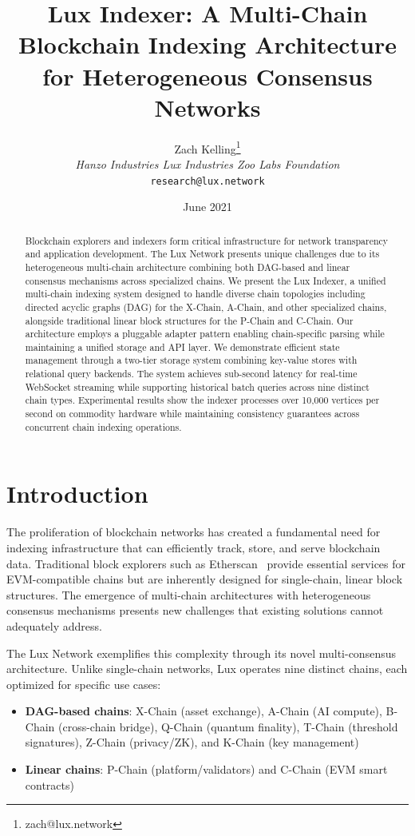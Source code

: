 \documentclass[11pt,twocolumn]{article}
\title{Lux Indexer: A Multi-Chain Blockchain Indexing Architecture for Heterogeneous Consensus Networks}
\author{Zach Kelling\thanks{zach@lux.network} \\ \textit{Hanzo Industries \quad Lux Industries \quad Zoo Labs Foundation} \\ \texttt{research@lux.network}}
\date{June 2021}
\begin{document}
\maketitle

\begin{abstract}
Blockchain explorers and indexers form critical infrastructure for network transparency and application development. The Lux Network presents unique challenges due to its heterogeneous multi-chain architecture combining both DAG-based and linear consensus mechanisms across specialized chains. We present the Lux Indexer, a unified multi-chain indexing system designed to handle diverse chain topologies including directed acyclic graphs (DAG) for the X-Chain, A-Chain, and other specialized chains, alongside traditional linear block structures for the P-Chain and C-Chain. Our architecture employs a pluggable adapter pattern enabling chain-specific parsing while maintaining a unified storage and API layer. We demonstrate efficient state management through a two-tier storage system combining key-value stores with relational query backends. The system achieves sub-second latency for real-time WebSocket streaming while supporting historical batch queries across nine distinct chain types. Experimental results show the indexer processes over 10,000 vertices per second on commodity hardware while maintaining consistency guarantees across concurrent chain indexing operations.
\end{abstract}

\section{Introduction}

The proliferation of blockchain networks has created a fundamental need for indexing infrastructure that can efficiently track, store, and serve blockchain data. Traditional block explorers such as Etherscan~\cite{etherscan} provide essential services for EVM-compatible chains but are inherently designed for single-chain, linear block structures. The emergence of multi-chain architectures with heterogeneous consensus mechanisms presents new challenges that existing solutions cannot adequately address.

The Lux Network exemplifies this complexity through its novel multi-consensus architecture. Unlike single-chain networks, Lux operates nine distinct chains, each optimized for specific use cases:

\begin{itemize}
\item \textbf{DAG-based chains}: X-Chain (asset exchange), A-Chain (AI compute), B-Chain (cross-chain bridge), Q-Chain (quantum finality), T-Chain (threshold signatures), Z-Chain (privacy/ZK), and K-Chain (key management)
\item \textbf{Linear chains}: P-Chain (platform/validators) and C-Chain (EVM smart contracts)
\end{itemize}
\end{document}

